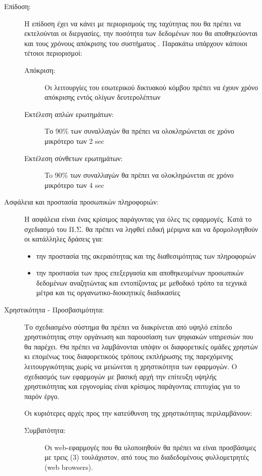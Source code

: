 \documentclass{assignment}
\begin{document}
\begin{description}
\item[Επίδοση:] Η επίδοση έχει να κάνει με περιορισμούς της ταχύτητας που θα πρέπει να εκτελούνται οι διεργασίες, την ποσότητα των δεδομένων που θα αποθηκεύονται και τους χρόνους απόκρισης του συστήματος \cite{triadis}. Παρακάτω υπάρχουν κάποιοι τέτοιοι περιορισμοί:
\begin{description}
	\item [Απόκριση:] Οι λειτουργίες του εσωτερικού δικτυακού κόμβου πρέπει να έχουν χρόνο απόκρισης εντός ολίγων δευτερολέπτων

	\item [Εκτέλεση απλών ερωτημάτων:] Το 90\% των συναλλαγών θα πρέπει να ολοκληρώνεται σε χρόνο μικρότερο των 2 sec

	\item [Εκτέλεση σύνθετων ερωτημάτων:] To 90\% των συναλλαγών θα πρέπει να ολοκληρώνεται σε χρόνο μικρότερο των 4 sec
\end{description}

\item[Ασφάλεια και προστασία προσωπικών πληροφοριών:] Η ασφάλεια είναι ένας κρίσιμος παράγοντας για όλες τις εφαρμογές. Κατά το σχεδιασμό του Π.Σ. θα πρέπει να ληφθεί ειδική μέριμνα και να δρομολογηθούν οι κατάλληλες δράσεις για:
\begin{itemize}
	\item την προστασία της ακεραιότητας και της διαθεσιμότητας των πληροφοριών
	\item την προστασία των προς επεξεργασία και αποθηκευμένων προσωπικών δεδομένων αναζητώντας και εντοπίζοντας με μεθοδικό τρόπο τα τεχνικά μέτρα και τις οργανωτικο-διοικητικές διαδικασίες
\end{itemize}

\item[Χρηστικότητα - Προσβασιμότητα:] Το σχεδιασμένο σύστημα θα πρέπει να διακρίνεται από υψηλό επίπεδο χρηστικότητας στην οργάνωση και παρουσίαση των ψηφιακών υπηρεσιών που θα παρέχει. Θα πρέπει να λαμβάνονται υπόψιν οι διαφορετικές ομάδες χρηστών κι επομένως τους διαφορετικούς τρόπους εκπλήρωσης της παρεχόμενης λειτουργικότητας χωρίς να μειώνεται η χρηστικότητα των εφαρμογών. Ο σχεδιασμός των εφαρμογών με βασική αρχή την επίτευξη υψηλής χρηστικότητας και εργονομίας είναι κρίσιμος παράγοντας επιτυχίας για το παρόν έργο.

Οι κυριότερες αρχές προς την κατεύθυνση της χρηστικότητας περιλαμβάνουν:
\begin{description}
	\item[Συμβατότητα:] Οι web-εφαρμογές που θα υλοποιηθούν θα πρέπει να είναι προσβάσιμες με τρεις (3) τουλάχιστον, από τους πιο διαδεδομένους
φυλλομετρητές (web browsers).


\end{description}
\end{description}
\end{document}
